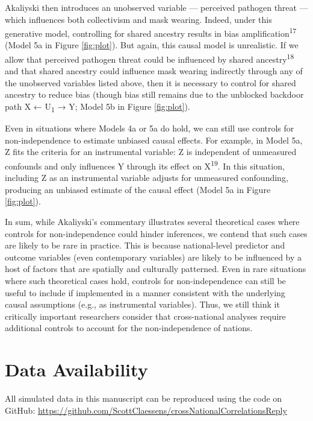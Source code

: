 \documentclass[
  man, donotrepeattitle,floatsintext]{apa6}
\begin{document}
Akaliyski then introduces an unobserved variable --- perceived pathogen threat
--- which influences both collectivism and mask wearing. Indeed, under this
generative model, controlling for shared ancestry results in bias
amplification\textsuperscript{17} (Model 5a in Figure \ref{fig:plot}).
But again, this causal model is unrealistic. If we allow that perceived pathogen
threat could be influenced by shared ancestry\textsuperscript{18} and that shared
ancestry could influence mask wearing indirectly through any of the unobserved
variables listed above, then it is necessary to control for shared ancestry to
reduce bias (though bias still remains due to the unblocked backdoor path
X ← U\textsubscript{1} → Y; Model 5b in Figure \ref{fig:plot}).

Even in situations where Models 4a or 5a do hold, we can still use controls for
non-independence to estimate unbiased causal effects. For example, in Model 5a,
Z fits the criteria for an instrumental variable: Z is independent of unmeasured
confounds and only influences Y through its effect on X\textsuperscript{19}. In this
situation, including Z as an instrumental variable adjusts for unmeasured
confounding, producing an unbiased estimate of the causal effect (Model 5a in
Figure \ref{fig:plot}).

In sum, while Akaliyski's commentary illustrates several theoretical cases
where controls for non-independence could hinder inferences, we contend that
such cases are likely to be rare in practice. This is because national-level
predictor and outcome variables (even contemporary variables) are likely to be
influenced by a host of factors that are spatially and culturally patterned.
Even in rare situations where such theoretical cases hold, controls for
non-independence can still be useful to include if implemented in a manner
consistent with the underlying causal assumptions (e.g., as instrumental
variables). Thus, we still think it critically important researchers consider
that cross-national analyses require additional controls to account for the
non-independence of nations.

\newpage
\nolinenumbers

\hypertarget{data-availability}{%
\section{Data Availability}\label{data-availability}}

All simulated data in this manuscript can be reproduced using the code on
GitHub: \url{https://github.com/ScottClaessens/crossNationalCorrelationsReply}
\end{document}
